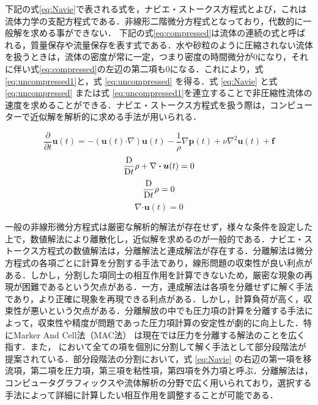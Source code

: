 \documentclass[a4j,12pt]{jreport}
\begin{document}
	下記の式\ref{eq:Navie}で表される式を，ナビエ・ストークス方程式とよび，これは流体力学の支配方程式である．非線形二階微分方程式となっており，代数的に一般解を求める事ができない．
	下記の式\ref{eq:compressed}は流体の連続の式と呼ばれる，質量保存や流量保存を表す式である．水や砂粒のように圧縮されない流体を扱うときは，流体の密度が常に一定，つまり密度の時間微分が0になり，それに伴い式\ref{eq:compressed}の左辺の第二項も0になる．これにより，式\ref{eq:uncompressed1}と，式 \ref{eq:uncompressed} を得る．式 \ref{eq:Navie} と式\ref{eq:uncompressed} または式 \ref{eq:uncompressed1}を連立することで非圧縮性流体の速度を求めることができる．ナビエ・ストークス方程式を扱う際は，コンピューターで近似解を解析的に求める手法が用いられる．
	
	\begin{equation}\label{eq:Navie}
		\frac{\partial}{\partial t}\bm{u} (t)  = - (\bm{u} (t)  \boldsymbol{\cdot}\nabla) \bm{u} (t)   - \frac{1}{\rho}\nabla \bm{p} (t)  + \nu\nabla^2\bm{u} (t)  + \bm{f}
	\end{equation}
	\begin{equation}\label{eq:compressed}
		\frac{{\rm{D}}}{{\rm{D}}t}\rho + \nabla\boldsymbol{\cdot}\bm{u} (t)  = 0
	\end{equation}
	\begin{equation}\label{eq:uncompressed1}
		\frac{{\rm{D}}}{{\rm{D}}t}\rho  = 0
	\end{equation}
	\begin{equation}\label{eq:uncompressed}
		\nabla\boldsymbol{\cdot}\bm{u} (t)  = 0
	\end{equation}

一般の非線形微分方程式は厳密な解析的解法が存在せず，様々な条件を設定した上で，数値解法により離散化し，近似解を求めるのが一般的である．ナビエ・ストークス方程式の数値解法は，分離解法と連成解法が存在する．分離解法は微分方程式の各項ごとに計算を分割する手法であり，線形問題の収束性が良い利点がある．しかし，分割した項同士の相互作用を計算できないため，厳密な現象の再現が困難であるという欠点がある．一方，連成解法は各項を分離せずに解く手法であり，より正確に現象を再現できる利点がある．しかし，計算負荷が高く，収束性が悪いという欠点がある．分離解放の中でも圧力項の計算を分離する手法\cite{MAC,Chorin}によって，収束性や精度が問題であった圧力項計算の安定性が劇的に向上した．特にMarker And Cell法（MAC法） \cite{MAC}は現在では圧力を分離する解法のことを広く指す．また， \cite{MAC}において全ての項を個別に分割して解く手法として部分段階法が提案されている．部分段階法の分割において，式 \ref{eq:Navie} の右辺の第一項を移流項，第二項を圧力項，第三項を粘性項，第四項を外力項と呼ぶ．分離解法は，コンピュータグラフィックスや流体解析の分野で広く用いられており，選択する手法によって詳細に計算したい相互作用を調整することが可能である．
\end{document}
